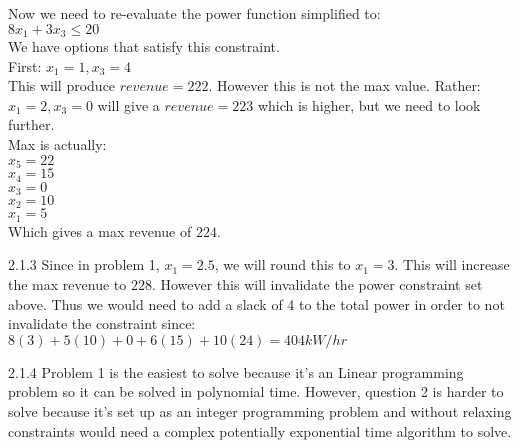 \documentclass[11pt,letterpaper]{article}
\begin{document}
\begin{description}
Now we need to re-evaluate the power function simplified to:\\
$8x_1 + 3x_3 \le 20$\\
We have options that satisfy this constraint.\\
First: $x_1 = 1, x_3 = 4$\\
This will produce $revenue = 222$.  However this is not the max
value. Rather:\\
$x_1 = 2, x_3 =0 $ will give a $revenue = 223$ which is higher, but we
need to look further.\\
Max is actually:\\
$x_5 = 22$\\
$x_4 = 15$\\
$x_3 = 0$\\
$x_2 = 10$\\
$x_1 = 5$\\
Which gives a max revenue of $224$.
\item{2.1.3}
Since in problem 1, $x_1 = 2.5$, we will round this to $x_1 = 3$.
This will increase the max revenue to $228$.  However this will
invalidate the power constraint set above.  Thus we would need to add
a slack of 4 to the total power in order to not invalidate the
constraint since:\\
$8(3) + 5(10) + 0 + 6(15) + 10(24) = 404 kW/hr$\\
\item{2.1.4}
Problem 1 is the easiest to solve because it's an Linear programming
problem so it can be solved in polynomial time.  However, question 2
is harder to solve because it's set up as an integer programming
problem and without relaxing constraints would need a complex
potentially exponential time algorithm to solve.\\\\
\end{description}
\end{document}
